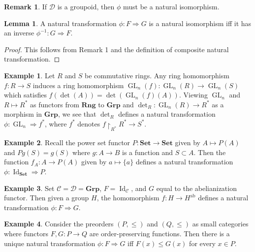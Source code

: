 \documentclass[10pt,letterpaper,cm]{nupset}
\theoremstyle{definition}
\newtheorem{exmp}{Example}
\newtheorem{remark}{Remark}
\newtheorem{lemma}{Lemma}
\newcommand{\1}{\mathbf{1}}
\renewcommand{\c}{\mathscr{C}}
\renewcommand{\d}{\mathscr{D}}
\newcommand{\0}{\vec 0}
\DeclareMathOperator*{\GL}{GL}
\DeclareMathOperator{\id}{Id}
\DeclareMathOperator{\ab}{ab}
\begin{document}
\begin{remark}
If $\d$ is a groupoid, then $\phi$ must be a natural isomorphism.
\end{remark}

\begin{lemma}
A natural transformation $\phi: F \Rightarrow G$ is a natural isomorphism iff it has an inverse $\phi^{-1} : G \Rightarrow F$.
\end{lemma}
\begin{proof}
This follows from Remark 1 and the definition of composite natural transformation.
\end{proof}

\begin{exmp}
Let $R$ and $S$ be commutative rings. Any ring homomorphism $f: R \to S$ induces a ring homomorphism $\GL_n(f): \GL_n(R) \to \GL_n(S)$ which satisfies $f(\det(A)) = \det(\GL_n(f)(A))$. Viewing $\GL_n$ and $R \mapsto R^{\ast}$ as functors from $\mathbf{Rng}$ to $\mathbf{Grp}$ and $\det_R : \GL_n(R) \to R^{\ast}$ as a morphism in $\mathbf{Grp}$, we see that $\det_R$ defines a natural transformation $\phi : \GL_n \Rightarrow f^{\ast}$, where $f^{\ast}$ denotes $f\restriction_{R^{\ast}} R^{\ast} \to S^{\ast}$.  

\begin{center}
\end{center}
\end{exmp}

\begin{exmp}
Recall the power set functor $P: \mathbf{Set} \to \mathbf{Set}$ given by $A \mapsto P(A)$ and $Pg(S) = g(S)$ where $g: A \to B$ is a function and $S\subset A$. Then the function $f_A: A \to P(A)$ given by $a \mapsto \{a\}$ defines a natural transformation $\phi: \id_{\mathbf{Set}} \Rightarrow P$.
\end{exmp}

\begin{exmp}
Set $\c = \d = \mathbf{Grp}$, $F= \id_{\c}$, and $G$ equal to the abelianization functor. Then given a group $H$, the homomorphism $f: H \to H^{\ab}$ defines a natural transformation $\phi: F \Rightarrow G$.
\end{exmp}

\begin{exmp}
Consider the preorders $(P, \leq)$ and $(Q, \leq)$ as small categories where functors $F, G: P \to Q$ are order-preserving functions. Then there is a unique natural transformation $\phi: F \Rightarrow G$ iff $F(x) \leq G(x)$ for every $x\in P$.
\end{exmp}
\end{document}
